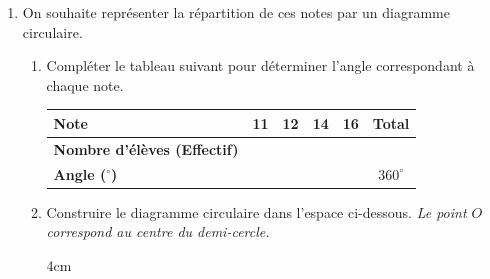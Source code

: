 \documentclass[a4paper]{book}
\begin{document}
\begin{exercice}
\begin{enumerate}[leftmargin=*]
\begin{center}
            \end{center}
            
            
            \item On souhaite représenter la répartition de ces notes par un diagramme circulaire. 
            \begin{enumerate}[leftmargin=*]
                \item Compléter le tableau suivant pour déterminer l'angle correspondant à chaque note.

                \begin{center}
                \renewcommand{\arraystretch}{1.2}
                \begin{tabular}{|l|*{5}{c|}}
                \hline
                \textbf{Note} & \hspace{0.6cm} 11 \hspace{0.6cm} & \hspace{0.6cm} 12 \hspace{0.6cm} & \hspace{0.6cm} 14 \hspace{0.6cm} & \hspace{0.6cm} 16 \hspace{0.6cm} & \hspace{0.2cm} \textbf{Total} \hspace{0.2cm} \\
                \hline
                \textbf{Nombre d'élèves (Effectif)} & & & & & \\
                \hline
                \textbf{Angle ($^{\circ}$)} & & & & & $360^{\circ}$ \\
                \hline
                \end{tabular}
                \end{center}
            
            
                \item Construire le diagramme circulaire dans l'espace ci-dessous. \textit{Le point $O$ correspond au centre du demi-cercle.}
            
                \begin{ZoneReponse}{4cm}
                \end{ZoneReponse}
            \end{enumerate}
        \end{enumerate} 
    \end{exercice}
\end{document}
